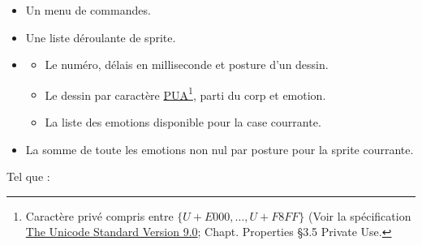 \documentclass{report}
\begin{document}
\begin{itemize}
	\item Un menu de commandes.
	\item Une liste déroulante de sprite.
    \item {
		\begin{itemize}
			\item Le numéro, délais en milliseconde et posture d'un dessin.
			\item Le dessin par caractère \textendash\href{https://en.wikipedia.org/wiki/Private_Use_Areas}{PUA}\footnote{ Caractère privé compris entre $\{U+E000, \ldots{}, U+F8FF\}$ (Voir la spécification \href{http://www.unicode.org/versions/Unicode9.0.0/ch03.pdf}{The Unicode Standard Version 9.0}; Chapt. Properties \S{3.5} \textendash{} Private Use. }\textendash{}, parti du corp et emotion.
			\item La liste des emotions disponible pour la case courrante.
		\end{itemize}
    }
    \item La somme de toute les emotions non nul par posture pour la sprite courrante.
\end{itemize}

Tel que :
\end{document}
